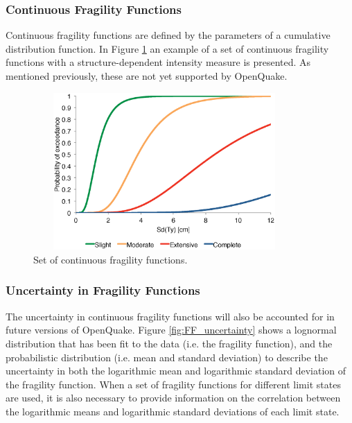 \subsubsection{Continuous Fragility Functions}
Continuous fragility functions are defined by the parameters of a cumulative distribution function. In Figure \ref{fig:FFcontinuous} an example of a set of continuous fragility functions with a structure-dependent intensity measure is presented. As mentioned previously, these are not yet supported by OpenQuake.

\begin{figure}[ht]
\centering
\includegraphics[width=10cm,height=6cm]{./Figures/Part_Risk/FFContinuous.eps}
\caption{Set of continuous fragility functions.}
\label{fig:FFcontinuous}
\end{figure}

\subsubsection{Uncertainty in Fragility Functions}
The uncertainty in continuous fragility functions will also be accounted for in future versions of OpenQuake. Figure \ref{fig:FF_uncertainty} shows a lognormal distribution that has been fit to the data (i.e. the fragility function), and the probabilistic distribution (i.e. mean and standard deviation) to describe the uncertainty in both the logarithmic mean and logarithmic standard deviation of the fragility function. When a set of fragility functions for different limit states are used, it is also necessary to provide information on the correlation between the logarithmic means and logarithmic standard deviations of each limit state.



